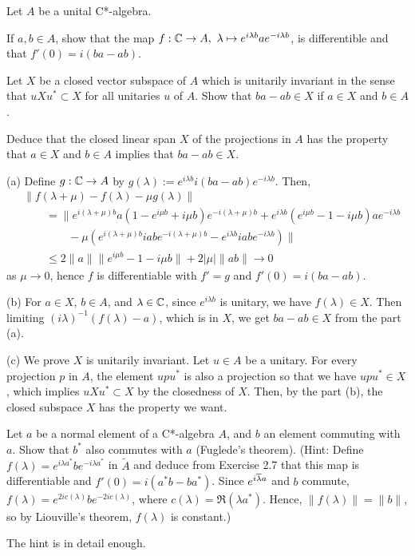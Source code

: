 \documentclass[12pt]{article}
\begin{document}
\begin{prb}
Let $A$ be a unital C*-algebra.
\begin{parts}
\item
If $a,b\in A$, show that the map $f:\mathbb{C}\to A,\ \lambda\mapsto e^{i\lambda b}ae^{-i\lambda b}$, is differentible and that $f'(0)=i(ba-ab)$.
\item
Let $X$ be a closed vector subspace of $A$ which is unitarily invariant in the sense that $uXu^*\subset X$ for all unitaries $u$ of $A$.
Show that $ba-ab\in X$ if $a\in X$ and $b\in A$.
\item
Deduce that the closed linear span $X$ of the projections in $A$ has the property that $a\in X$ and $b\in A$ implies that $ba-ab\in X$.
\end{parts}
\end{prb}
\begin{sol}
(a)
Define $g:\mathbb{C}\to A$ by $g(\lambda):=e^{i\lambda b}i(ba-ab)e^{-i\lambda b}$.
Then,
\begin{align*}
&\|f(\lambda+\mu)-f(\lambda)-\mu g(\lambda)\|\\
&\qquad=\|e^{i(\lambda+\mu)b}a(1-e^{i\mu b}+i\mu b)e^{-i(\lambda+\mu)b}
+e^{i\lambda b}(e^{i\mu b}-1-i\mu b)ae^{-i\lambda b}\\
&\qquad\qquad-\mu(e^{i(\lambda+\mu)b}iabe^{-i(\lambda+\mu)b}-e^{i\lambda b}iabe^{-i\lambda b})\|\\
&\qquad\le2\|a\|\|e^{i\mu b}-1-i\mu b\|+2|\mu|\|ab\|\to0
\end{align*}
as $\mu\to0$, hence $f$ is differentiable with $f'=g$ and $f'(0)=i(ba-ab)$.

(b)
For $a\in X$, $b\in A$, and $\lambda\in\mathbb{C}$, since $e^{i\lambda b}$ is unitary, we have $f(\lambda)\in X$.
Then limiting $(i\lambda)^{-1}(f(\lambda)-a)$, which is in $X$, we get $ba-ab\in X$ from the part (a).

(c)
We prove $X$ is unitarily invariant.
Let $u\in A$ be a unitary.
For every projection $p$ in $A$, the element $upu^*$ is also a projection so that we have $upu^*\in X$, which implies $uXu^*\subset X$ by the closedness of $X$.
Then, by the part (b), the closed subspace $X$ has the property we want.
\end{sol}


\begin{prb}
Let $a$ be a normal element of a C*-algebra $A$, and $b$ an element commuting with $a$. Show that $b^*$ also commutes with $a$ (Fuglede's theorem).
(Hint: Define $f(\lambda)=e^{i\lambda a^*}be^{- i\lambda a^*}$ in $\tilde A$ and deduce from Exercise 2.7 that this map is differentiable and $f'(0)=i(a^*b-ba^*)$.
Since $e^{i\overline\lambda a}$ and $b$ commute, $f(\lambda)=e^{2ic(\lambda)}be^{-2ic(\lambda)}$, where $c(\lambda)=\Re(\lambda a^*)$.
Hence, $\|f(\lambda)\|=\|b\|$, so by Liouville's theorem, $f(\lambda)$ is constant.)
\end{prb}
\begin{sol}
The hint is in detail enough.
\end{sol}
\end{document}
